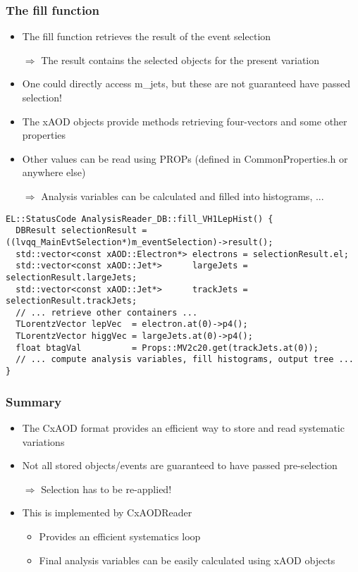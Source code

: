 \documentclass{beamer}
\begin{document}
\begin{frame}[fragile]
\frametitle{The fill function}
\begin{itemize}
 \item The fill function retrieves the result of the event selection
 \item[$\Rightarrow$] The result contains the selected objects for the present variation
 \item One could directly access m\_jets, but these are not guaranteed have passed selection!
 \item The xAOD objects provide methods retrieving four-vectors and some other properties
 \item Other values can be read using PROPs (defined in CommonProperties.h or anywhere else)
 \item[$\Rightarrow$] Analysis variables can be calculated and filled into histograms, ...
\end{itemize}
\begin{center}
\begin{minipage}{0.9\textwidth}
{\tiny
\begin{lstlisting}
EL::StatusCode AnalysisReader_DB::fill_VH1LepHist() {
  DBResult selectionResult = ((lvqq_MainEvtSelection*)m_eventSelection)->result();
  std::vector<const xAOD::Electron*> electrons = selectionResult.el;
  std::vector<const xAOD::Jet*>      largeJets = selectionResult.largeJets;
  std::vector<const xAOD::Jet*>      trackJets = selectionResult.trackJets;
  // ... retrieve other containers ...
  TLorentzVector lepVec  = electron.at(0)->p4();
  TLorentzVector higgVec = largeJets.at(0)->p4();
  float btagVal          = Props::MV2c20.get(trackJets.at(0));
  // ... compute analysis variables, fill histograms, output tree ...
}
\end{lstlisting}
}
\end{minipage}
\end{center}
\end{frame}

\begin{frame}[fragile]
\frametitle{Summary}
\begin{itemize}
 \item The CxAOD format provides an efficient way to store and read systematic variations
 \item Not all stored objects/events are guaranteed to have passed pre-selection
 \item[$\Rightarrow$] Selection has to be re-applied!
 \item This is implemented by CxAODReader 
\begin{itemize}
\scriptsize
 \item Provides an efficient systematics loop
 \item Final analysis variables can be easily calculated using xAOD objects
\end{itemize}
\end{itemize}
\end{frame}

% 
\end{document}
